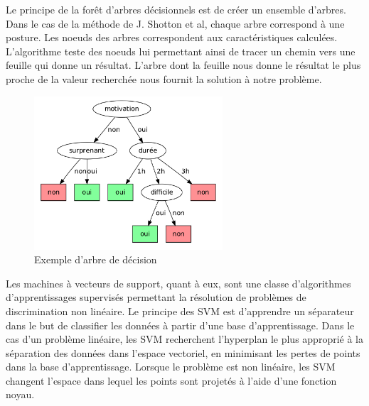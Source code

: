 Le principe de la forêt d'arbres décisionnels\cite{randomDecisionForest} est de créer un ensemble d'arbres.
Dans le cas de la méthode de J. Shotton et al\cite{kinectSegmentation}, chaque arbre correspond à une posture.
Les noeuds des arbres correspondent aux caractéristiques calculées. L'algorithme teste des noeuds lui permettant ainsi de tracer un
chemin vers une feuille qui donne un résultat. L'arbre dont la feuille nous donne le résultat le plus proche 
de la valeur recherchée nous fournit la solution à notre problème.\\

\begin{figure}[!ht]
  \begin{center}
    \includegraphics[width=7cm]{image/randomForest.png}
    \caption[The LOF caption]{Exemple d'arbre de décision\footnotemark }
  \end{center}
\end{figure}

Les machines à vecteurs de support\cite{SVM}, quant à eux, sont une classe d'algorithmes d'apprentissages supervisés permettant la
résolution de 
problèmes de discrimination non linéaire. Le principe des SVM est d'apprendre un séparateur dans le but de classifier les données à partir
d'une base d'apprentissage. Dans le cas d'un problème linéaire, les SVM recherchent l'hyperplan le plus approprié à la séparation des données
dans l'espace vectoriel, en minimisant les pertes de points dans la base d'apprentissage. Lorsque le problème est non linéaire,
les SVM changent l'espace dans lequel les points sont projetés à l'aide d'une fonction noyau.

